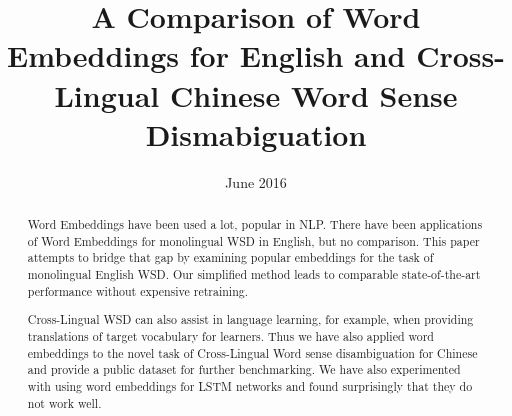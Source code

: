 \documentclass[11pt]{article}
\title{A Comparison of Word Embeddings for English and Cross-Lingual Chinese Word Sense Dismabiguation}
\date{June 2016}
\begin{document}
\maketitle
  

\begin{abstract}
Word Embeddings have been used a lot, popular in NLP. 
There have been applications of Word Embeddings for monolingual WSD in English, but no comparison.
This paper attempts to bridge that gap by examining popular embeddings for the task of monolingual English WSD. 
Our simplified method leads to comparable state-of-the-art performance without expensive retraining. 


Cross-Lingual WSD can also assist in language learning, for example, when providing translations of target vocabulary for learners. 
Thus we have also applied word embeddings to the novel task of Cross-Lingual Word sense disambiguation for Chinese and provide a public dataset for further benchmarking.
We have also experimented with using word embeddings for LSTM networks and found surprisingly that they do not work well.


\end{abstract}









%
%

%



\end{document}
